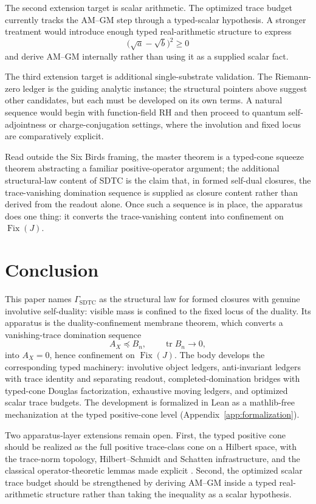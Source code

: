 \documentclass[11pt]{article}
\DeclareMathOperator{\Fix}{Fix}
\DeclareMathOperator{\trace}{tr}
\newcommand{\AX}{A_{X}}
\newcommand{\GamSDTC}{\Gamma_{\mathrm{SDTC}}}
\theoremstyle{definition}
\begin{document}
The second extension target is scalar arithmetic.  The optimized
trace budget currently tracks the AM--GM step through a
typed-scalar hypothesis.  A stronger treatment would introduce
enough typed real-arithmetic structure to express
\[
  \bigl(\sqrt{a}-\sqrt{b}\bigr)^2\geq0
\]
and derive AM--GM internally rather than using it as a supplied
scalar fact.

The third extension target is additional single-substrate
validation.  The Riemann-zero ledger is the guiding analytic
instance; the structural pointers above suggest other candidates,
but each must be developed on its own terms.  A natural sequence
would begin with function-field RH and then proceed to quantum
self-adjointness or charge-conjugation settings, where the
involution and fixed locus are comparatively explicit.

Read outside the Six Birds framing, the master theorem is a
typed-cone squeeze theorem abstracting a familiar positive-operator
argument; the additional structural-law content of SDTC is the
claim that, in formed self-dual closures, the trace-vanishing
domination sequence is supplied as closure content rather than
derived from the readout alone.  Once such a sequence is in place,
the apparatus does one thing: it converts the trace-vanishing
content into confinement on \(\Fix(J)\).
 

\section{Conclusion}
\label{sec:conclusion}

This paper names \(\GamSDTC\) as the structural law for formed
closures with genuine involutive self-duality: visible mass is
confined to the fixed locus of the duality.  Its apparatus is the
duality-confinement membrane theorem, which converts a
vanishing-trace domination sequence
\[
  \AX\preceq B_n,
  \qquad
  \trace B_n\to0,
\]
into \(\AX=0\), hence confinement on \(\Fix(J)\).  The body
develops the corresponding typed machinery: involutive object
ledgers, anti-invariant ledgers with trace identity and separating
readout, completed-domination bridges with typed-cone Douglas
factorization, exhaustive moving ledgers, and optimized scalar
trace budgets.  The development is formalized in Lean as a
mathlib-free mechanization at the typed positive-cone level
(Appendix~\ref{app:formalization}).

Two apparatus-layer extensions remain open.  First, the typed positive cone
should be realized as the full positive trace-class cone on a
Hilbert space, with the trace-norm topology, Hilbert--Schmidt and
Schatten infrastructure, and the classical operator-theoretic
lemmas made explicit \citep{Simon2005,ReedSimon1980}.  Second, the
optimized scalar trace budget should be strengthened by deriving
AM--GM \citep{HardyLittlewoodPolya1952} inside a typed
real-arithmetic structure rather than taking the inequality as a
scalar hypothesis.
\end{document}
